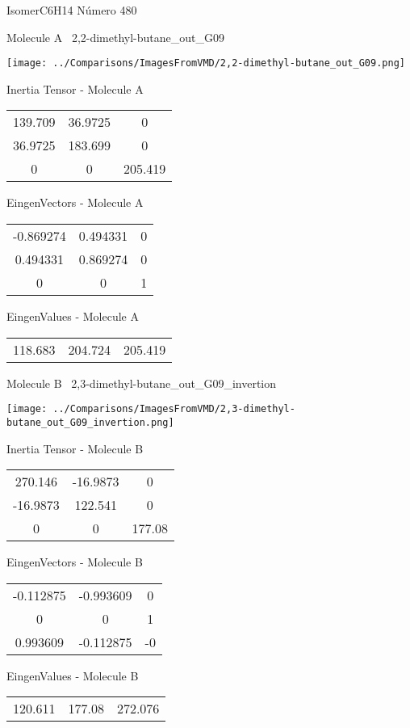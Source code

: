 \vtab[-3cm]
\begin{center}
{\large IsomerC6H14 \tab Número 480}
\end{center}
\begin{multicols}{2}
\begin{center}

Molecule A \
2,2-dimethyl-butane\_out\_G09

\texttt{[image: ../Comparisons/ImagesFromVMD/2,2-dimethyl-butane\_out\_G09.png]}

Inertia Tensor - Molecule A \\
\begin{tabular}{|c c c|}
139.709	 & 	36.9725	 & 	0	 \\
36.9725	 & 	183.699	 & 	0	 \\
0	 & 	0	 & 	205.419
\end{tabular}

\vtab
 EingenVectors - Molecule A     \\
\begin{tabular}{|c c c|}
-0.869274	 & 	0.494331	 & 	0	 \\
0.494331	 & 	0.869274	 & 	0	 \\
0	 & 	0	 & 	1
\end{tabular}

\vtab
 EingenValues - Molecule A     \\
\begin{tabular}{|c c c|}
118.683	 & 	204.724	 & 	205.419	 \\
\end{tabular}
\columnbreak

Molecule B \
2,3-dimethyl-butane\_out\_G09\_invertion

\texttt{[image: ../Comparisons/ImagesFromVMD/2,3-dimethyl-butane\_out\_G09\_invertion.png]}

Inertia Tensor - Molecule B \\
\begin{tabular}{|c c c|}
270.146	 & 	-16.9873	 & 	0	 \\
-16.9873	 & 	122.541	 & 	0	 \\
0	 & 	0	 & 	177.08
\end{tabular}

\vtab
 EingenVectors - Molecule B     \\
\begin{tabular}{|c c c|}
-0.112875	 & 	-0.993609	 & 	0	 \\
0	 & 	0	 & 	1	 \\
0.993609	 & 	-0.112875	 & 	-0
\end{tabular}

\vtab
 EingenValues - Molecule B     \\
\begin{tabular}{|c c c|}
120.611	 & 	177.08	 & 	272.076	 \\
\end{tabular}

\end{center}
\end{multicols}

